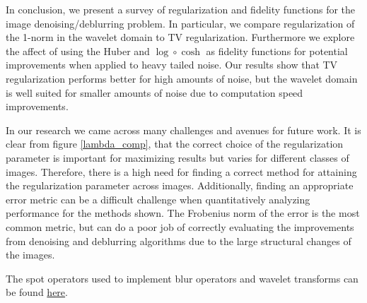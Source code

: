 \documentclass[10pt,a4paper]{article}
\begin{document}
	In conclusion, we present a survey of regularization and fidelity functions for the image denoising/deblurring problem. In particular, we compare regularization of the 1-norm in the wavelet domain to TV regularization. Furthermore we explore the affect of using the Huber and $\log \circ \cosh$  as fidelity functions for potential improvements when applied to heavy tailed noise. Our results show that TV regularization performs better for high amounts of noise, but the wavelet domain is well suited for smaller amounts of noise due to computation speed improvements. 
	
	In our research we came across many challenges and avenues for future work. It is clear from figure \ref{lambda_comp}, that the correct choice of the regularization parameter is important for maximizing results but varies for different classes of images. Therefore, there is a high need for finding a correct method for attaining the regularization parameter across images. Additionally, finding an appropriate error metric can be a difficult challenge when quantitatively analyzing performance for the methods shown. The Frobenius norm of the error is the most common metric, but can do a poor job of correctly evaluating the improvements from denoising and deblurring algorithms due to the large structural changes of the images. 
	
	
	
	
	
	
	
	
	The spot operators used to implement blur operators and wavelet transforms can be found {\color{blue}\href{http://www.cs.ubc.ca/labs/scl/spot/}{here}}.
	
	
\end{document}
